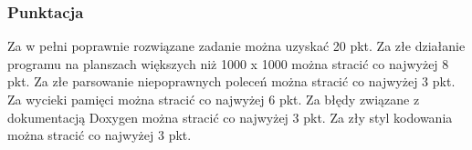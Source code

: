 \subsubsection*{Punktacja}

Za w pełni poprawnie rozwiązane zadanie można uzyskać 20 pkt. Za złe działanie programu na planszach większych niż 1000 x 1000 można stracić co najwyżej 8 pkt. Za złe parsowanie niepoprawnych poleceń można stracić co najwyżej 3 pkt. Za wycieki pamięci można stracić co najwyżej 6 pkt. Za błędy związane z dokumentacją Doxygen można stracić co najwyżej 3 pkt. Za zły styl kodowania można stracić co najwyżej 3 pkt. 